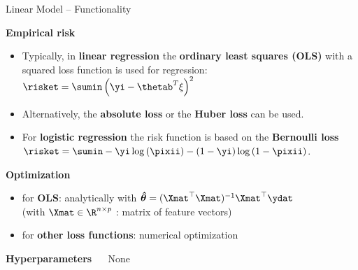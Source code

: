 \documentclass[11pt,compress,t,notes=noshow, xcolor=table]{beamer}
\newcommand{\highlight}[1]{\textcolor{highlightcol}{\textbf{#1}}}
\begin{document}
\begin{frame}{Linear Model -- Functionality}

\footnotesize

\highlight{Empirical risk}
\begin{itemize}\footnotesize
  \item Typically, in \textbf{linear regression} the \textbf{ordinary least squares (OLS)} with a squared loss function is used for regression: $\risket  = \sumin \left(\yi - \thetab^T \xi\right)^2$
    
   \item Alternatively, the \textbf{absolute loss} or the \textbf{Huber loss} can be used. %
  
  \item For \textbf{logistic regression} the risk function is based on the \textbf{Bernoulli loss} $\risket = \sumin -\yi \log \left(\pixii\right) - (1 - \yi) \log \left(1 - \pixii \right)$.
  


\end{itemize}

\footnotesize

\medskip

\highlight{Optimization}
\begin{itemize}\footnotesize
  \item for \textbf{OLS}: analytically with $\bm{\hat \theta} = (\Xmat^\top \Xmat)^{-1} \Xmat^\top\ydat$ \\
  (with $\Xmat \in \R^{n \times p}$ : matrix of feature vectors)
  \item for \textbf{other loss functions}: numerical optimization 
\end{itemize}

\medskip

\highlight{Hyperparameters} ~~ None

\medskip


\end{frame}

\end{document}
